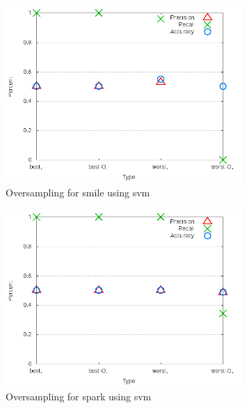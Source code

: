 \begin{figure}[!t]
\centering
\includegraphics[width=0.8\textwidth]{images/svm/test_4/smile_sample_range.png}
\caption{Oversampling for smile using \gls{svm}}
\label{fig:test_4_smile_svm}
\end{figure}

\begin{figure}[!t]
\centering
\includegraphics[width=0.8\textwidth]{images/svm/test_4/spark_sample_range.png}
\caption{Oversampling for spark using \gls{svm}}
\label{fig:test_4_spark_svm}
\end{figure}

